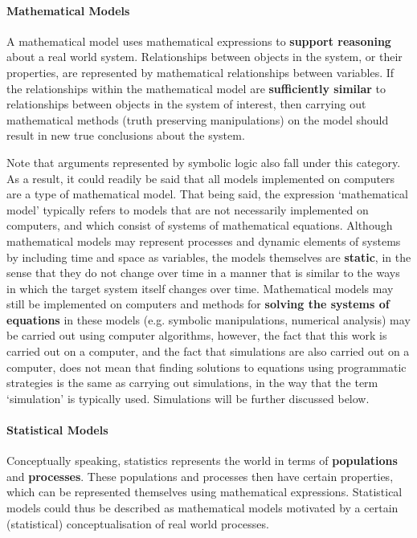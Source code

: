 \paragraph{Mathematical Models}

A mathematical model uses mathematical expressions to \textbf{support reasoning} about a real world system. Relationships between objects in the system, or their properties, are represented by mathematical relationships between variables. If the relationships within the mathematical model are \textbf{sufficiently similar} to relationships between objects in the system of interest, then carrying out mathematical methods (truth preserving manipulations) on the model should result in new true conclusions about the system. 

Note that arguments represented by symbolic logic also fall under this category. As a result, it could readily be said that all models implemented on computers are a type of mathematical model. That being said, the expression `mathematical model' typically refers to models that are not necessarily implemented on computers, and which consist of systems of mathematical equations.
\newl Although mathematical models may represent processes and dynamic elements of systems by including time and space as variables, the models themselves are \textbf{static}, in the sense that they do not change over time in a manner that is similar to the ways in which the target system itself changes over time. Mathematical models may still be implemented on computers and methods for \textbf{solving the systems of equations} in these models (e.g. symbolic manipulations, numerical analysis) may be carried out using computer algorithms, however, the fact that this work is carried out on a computer, and the fact that simulations are also carried out on a computer, does not mean that finding solutions to equations using programmatic strategies is the same as carrying out simulations, in the way that the term `simulation' is typically used. Simulations will be further discussed below.

\paragraph{Statistical Models}

Conceptually speaking, statistics represents the world in terms of \textbf{populations} and \textbf{processes}. These populations and processes then have certain properties, which can be represented themselves using mathematical expressions. Statistical models could thus be described as mathematical models motivated by a certain (statistical) conceptualisation of real world processes. 


